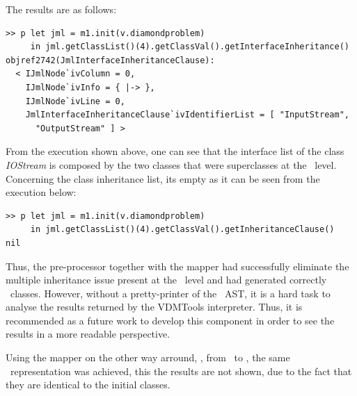 The results are as follows:

\lstset{style=Example}
\bigskip
\begin{lstlisting}
>> p let jml = m1.init(v.diamondproblem) 
     in jml.getClassList()(4).getClassVal().getInterfaceInheritance()
objref2742(JmlInterfaceInheritanceClause):
  < IJmlNode`ivColumn = 0,
    IJmlNode`ivInfo = { |-> },
    IJmlNode`ivLine = 0,
    JmlInterfaceInheritanceClause`ivIdentifierList = [ "InputStream",
      "OutputStream" ] >
\end{lstlisting}
\bigskip


From the execution shown above, one can see that the interface list of the class \textit{IOStream} is composed by the two classes that were superclasses at the \vpp\ level. Concerning the class inheritance list, its empty as it can be seen from the execution below:
\bigskip
\begin{lstlisting}
>> p let jml = m1.init(v.diamondproblem) 
     in jml.getClassList()(4).getClassVal().getInheritanceClause()
nil
\end{lstlisting}
\bigskip

Thus, the pre-processor together with the mapper had successfully eliminate the multiple inheritance issue present at the \vpp\ level and had generated correctly \jml\ classes. However, without a pretty-printer of the \jml\ AST, it is a hard task to analyse the results returned by the VDMTools interpreter. Thus, it is recommended as a future work to develop this component in order to see the results in a more readable perspective. 

Using the mapper on the other way arround, \ie, from \jml\ to \vpp, the same \vpp\ representation was achieved, this the results are not shown, due to the fact that they are identical to the initial classes.

